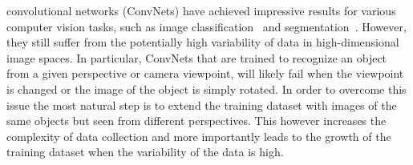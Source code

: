 \documentclass[10pt,journal,compsoc]{IEEEtran}
\begin{document}
	
	
	\IEEEpeerreviewmaketitle
	
	
	
	
	 convolutional networks (ConvNets) have achieved impressive results for various computer vision tasks, such as image classification~\cite{bb:krizhevsky2012imagenetNIPS2012} and segmentation~\cite{bb:seg}. However, they still suffer from the potentially high variability of data in high-dimensional image spaces. In particular, ConvNets that are trained to recognize an object from a given perspective or camera viewpoint, will likely fail when the viewpoint is changed or the image of the object is simply rotated. In order to overcome this issue the most natural step is to extend the training dataset with images of the same objects but seen from different perspectives. This however increases the complexity of data collection and more importantly leads to the growth of the training dataset when the variability of the data is high.
	
\end{document}

